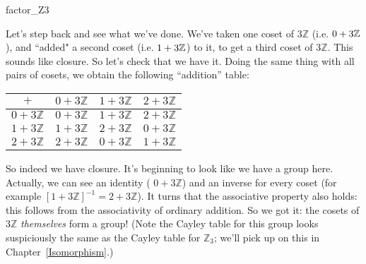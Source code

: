 \begin{example}{factor_Z3}
%
%
%
%
%

Let's step back and see what we've done. We've taken one coset of $ 3 {\mathbb Z}$ (i.e. $0 + 3\mathbb{Z}$), and ``added" a second coset (i.e. $1 + 3\mathbb{Z}$) to it, to get a third coset of $ 3 {\mathbb Z}$. This sounds like closure.  So let's check that we have it.  Doing the same thing with all pairs of cosets, we obtain the following ``addition'' table: 

\begin{center}
\begin{tabular}{c|ccc}
$+$             & $0 + 3{\mathbb Z}$ & $1 + 3{\mathbb Z}$ & $2 + 3{\mathbb Z}$ \\\hline
$0 + 3{\mathbb Z}$ & $0 + 3{\mathbb Z}$ & $1 + 3{\mathbb Z}$ & $2 + 3{\mathbb Z}$ \\
$1 + 3{\mathbb Z}$ & $1 + 3{\mathbb Z}$ & $2 + 3{\mathbb Z}$ & $0 + 3{\mathbb Z}$ \\
$2 + 3{\mathbb Z}$ & $2 + 3{\mathbb Z}$ & $0 + 3{\mathbb Z}$ & $1 + 3{\mathbb Z}$
\end{tabular}
\end{center}

So indeed we have closure.  It's beginning to look like we have a group here. Actually,  we can see an identity ( $0 + 3 {\mathbb Z}$) and an inverse for every coset (for example $[1 + 3 {\mathbb Z}]^{-1}=2 + 3 {\mathbb Z}$). It turns that the associative property also holds: this follows from the associativity of ordinary addition. So we got it: the cosets of $3 {\mathbb Z}$ \emph{themselves} form a group!  (Note the Cayley table for this group looks suspiciously the same as the Cayley table for ${\mathbb Z}_3$; we'll pick up on this in Chapter~\ref{Isomorphism}.)  
\end{example}

